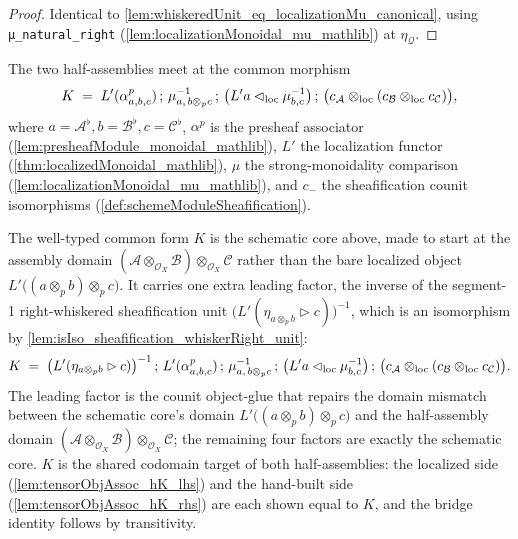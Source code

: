 \begin{proof}
  Identical to \cref{lem:whiskeredUnit_eq_localizationMu_canonical}, using
  \texttt{μ\_natural\_right} (\cref{lem:localizationMonoidal_mu_mathlib}) at
  \(\eta_{\mathcal{Q}}\).
\end{proof}

The two half-assemblies meet at the common morphism
\[
  K \;=\; L'(\alpha^p_{a,b,c}) \,;\, \mu_{a,\,b\otimes_p c}^{-1} \,;\,
    \bigl(L'a \lhd_{\mathrm{loc}} \mu_{b,c}^{-1}\bigr) \,;\,
    \bigl(c_{\mathcal{A}} \mathbin{\otimes_{\mathrm{loc}}} (c_{\mathcal{B}} \mathbin{\otimes_{\mathrm{loc}}} c_{\mathcal{C}})\bigr),
\]
where \(a = \mathcal{A}^{\flat}, b = \mathcal{B}^{\flat}, c = \mathcal{C}^{\flat}\),
\(\alpha^p\) is the presheaf associator
(\cref{lem:presheafModule_monoidal_mathlib}), \(L'\) the localization functor
(\cref{thm:localizedMonoidal_mathlib}), \(\mu\) the strong-monoidality comparison
(\cref{lem:localizationMonoidal_mu_mathlib}), and \(c_{-}\) the sheafification
counit isomorphisms (\cref{def:schemeModuleSheafification}).

\begin{definition}
  \label{def:assocCommonForm}
  The well-typed common form \(K\) is the schematic core above, made to start at the
  assembly domain \((\mathcal{A} \otimes_{\mathcal{O}_X} \mathcal{B})
  \otimes_{\mathcal{O}_X} \mathcal{C}\) rather than the bare localized object
  \(L'\!\bigl((a \otimes_p b) \otimes_p c\bigr)\). It carries one extra leading factor,
  the inverse of the segment-1 right-whiskered sheafification unit
  \(\bigl(L'(\eta_{a\otimes_p b} \rhd c)\bigr)^{-1}\), which is an isomorphism by
  \cref{lem:isIso_sheafification_whiskerRight_unit}:
  \[
    K \;=\; \bigl(L'(\eta_{a\otimes_p b} \rhd c)\bigr)^{-1} \,;\,
      L'(\alpha^p_{a,b,c}) \,;\, \mu_{a,\,b\otimes_p c}^{-1} \,;\,
      \bigl(L'a \lhd_{\mathrm{loc}} \mu_{b,c}^{-1}\bigr) \,;\,
      \bigl(c_{\mathcal{A}} \mathbin{\otimes_{\mathrm{loc}}} (c_{\mathcal{B}} \mathbin{\otimes_{\mathrm{loc}}} c_{\mathcal{C}})\bigr).
  \]
  The leading factor is the counit object-glue that repairs the domain mismatch
  between the schematic core's domain \(L'\!\bigl((a \otimes_p b) \otimes_p c\bigr)\)
  and the half-assembly domain \((\mathcal{A} \otimes_{\mathcal{O}_X} \mathcal{B})
  \otimes_{\mathcal{O}_X} \mathcal{C}\); the remaining four factors are exactly the
  schematic core. \(K\) is the shared codomain target of both half-assemblies: the
  localized side (\cref{lem:tensorObjAssoc_hK_lhs}) and the hand-built side
  (\cref{lem:tensorObjAssoc_hK_rhs}) are each shown equal to \(K\), and the bridge
  identity follows by transitivity.
\end{definition}

